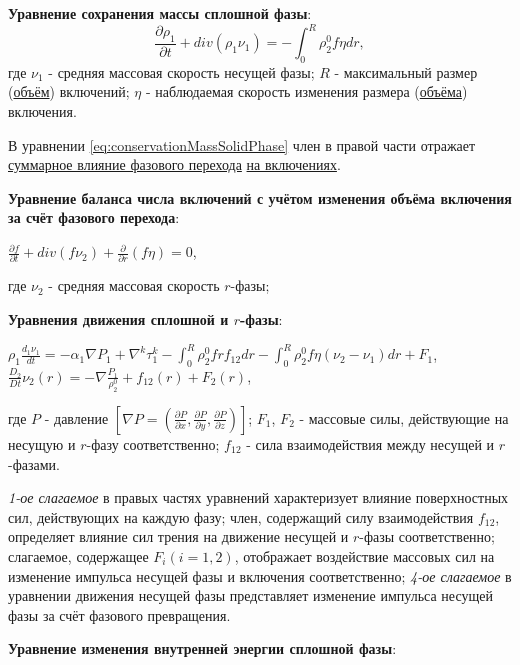 \documentclass[12pt, a4paper]{report}
\begin{document}
	\textbf{Уравнение сохранения массы сплошной фазы}:
	\begin{equation}\label{eq:conservationMassSolidPhase}
		\frac{\partial \rho_{1}}{\partial t} + div(\rho_{1} \nu_{1}) = -\int_{0}^{R} \rho_{2}^{0} f \eta dr,
	\end{equation}
	где $\nu_{1}$ - средняя массовая скорость несущей фазы; $R$ - максимальный размер (\underline{объём}) включений; $\eta$ - наблюдаемая скорость изменения размера (\underline{объёма}) включения. \par
	В уравнении \eqref{eq:conservationMassSolidPhase} член в правой части отражает \underline{суммарное влияние фазового перехода} \underline{на включениях}. \par
	\textbf{Уравнение баланса числа включений с учётом изменения объёма включения за счёт фазового перехода}:
	\begin{center}
		$\frac{\partial f}{\partial t} + div(f \nu_{2}) + \frac{\partial}{\partial r}(f \eta) = 0$,
	\end{center}
	где $\nu_{2}$ - средняя массовая скорость $r$-фазы; \par
	\textbf{Уравнения движения сплошной и $r$-фазы}:
	\begin{center}
		$\rho_{1} \frac{d_{1} \nu_{1}}{dt} = -\alpha_{1} \nabla P_{1} + \nabla^{k} \tau_{1}^{k} - \int_{0}^{R} \rho_{2}^{0} f r f_{12} dr - \int_{0}^{R} \rho_{2}^{0} f \eta (\nu_{2} - \nu_{1}) dr + F_{1}$, \\
		$\frac{D_{2}}{Dt}\nu_{2}(r) = - \nabla \frac{P_{1}}{\rho_{2}^{0}} + f_{12}(r) + F_{2}(r)$,	
	\end{center}
	где $P$ - давление $[\nabla P = (\frac{\partial P}{\partial x}, \frac{\partial P}{\partial y}, \frac{\partial P}{\partial z})]$; $F_{1}$, $F_{2}$ - массовые силы, действующие на несущую и $r$-фазу соответственно; $f_{12}$ - сила взаимодействия между несущей и $r$-фазами. \par
	\textit{1-ое слагаемое} в правых частях уравнений характеризует влияние поверхностных сил, действующих на каждую фазу; член, содержащий силу взаимодействия $f_{12}$, определяет влияние сил трения на движение несущей и $r$-фазы соответственно; слагаемое, содержащее $F_{i} (i = 1, 2)$, отображает воздействие массовых сил на изменение импульса несущей фазы и включения соответственно; \textit{4-ое слагаемое} в уравнении движения несущей фазы представляет изменение импульса несущей фазы за счёт фазового превращения. \par
	\textbf{Уравнение изменения внутренней энергии сплошной фазы}:
	\small
\end{document}
